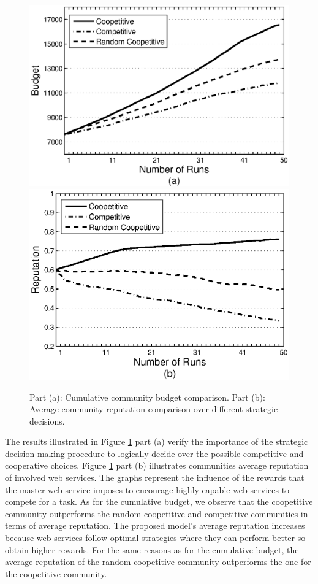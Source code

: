 \documentclass[runningheads,a4paper]{llncs}
\begin{document}
\begin{figure}%
\centering
\includegraphics[scale=0.41]{graphbgtmed.eps}
\includegraphics[scale=0.41]{graphrep.eps}
\caption{Part (a): Cumulative community budget comparison. Part
(b): Average community reputation comparison over different
strategic decisions.} \label{Graph1}
\end{figure}




The results illustrated in Figure \ref{Graph1} part (a)  verify
the importance of the strategic decision making procedure to
logically decide over the possible competitive and cooperative
choices. Figure \ref{Graph1} part (b) illustrates communities
average reputation of involved web services. The graphs represent
the influence of the rewards that the master web service imposes
to encourage highly capable web services to compete for a task. As
for the cumulative budget, we observe that the coopetitive
community outperforms the random coopetitive and competitive
communities in terms of average reputation. The proposed model's
average reputation increases because web services follow optimal
strategies where they can perform better so obtain higher rewards.
For the same reasons as for the cumulative budget, the average
reputation of the random coopetitive community
outperforms the one for the coopetitive community. %
\end{document}
